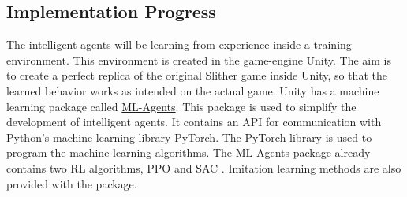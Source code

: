 \subsection{Implementation Progress} %

The intelligent agents will be learning from experience inside a training environment. This environment is created in the game-engine Unity. The aim is to create a perfect replica of the original Slither game inside Unity, so that the learned behavior works as intended on the actual game. Unity has a machine learning package called \href{https://github.com/Unity-Technologies/ml-agents}{ML-Agents}. This package is used to simplify the development of intelligent agents. It contains an API for communication with Python’s machine learning library \href{https://pytorch.org/}{PyTorch}. The PyTorch library is used to program the machine learning algorithms. The ML-Agents package already contains two RL algorithms, PPO \cite{PPO_2017} and SAC \cite{SAC_2018}. Imitation learning methods are also provided with the package. 



